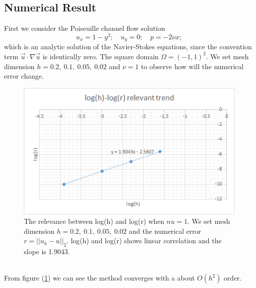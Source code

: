 \documentclass[a4paper]{article}
\begin{document}
\subsection{Numerical Result}
First we consider the Poiseuille channel flow solution
\begin{equation}
u_x = 1-y^2;\quad u_y = 0;\quad p=-2\nu x;
\label{pr::accurate}
\end{equation}
which is an analytic solution of the Navier-Stokes equations, since the convention term $\vec{u}\cdot \nabla \vec{u}$ is identically zero. The square domain $\Omega = (-1,1)^2$. We set mesh dimension $h=0.2,\ 0.1,\ 0.05,\ 0.02$ and $\nu=1$ to observe how will the numerical error change.
\begin{figure}[h]
\centering
\includegraphics[scale = 0.8]{images/convergence.png}
\caption{The relevance between log(h) and log(r) when $nu=1$. We set mesh dimension $h=0.2,\ 0.1, \ 0.05, \ 0.02$ and the numerical error $r=||u_h-u||_2$. log(h) and log(r) shows linear correlation and the slope is 1.9043.}
\label{im::log(h)-res}
\end{figure}
\\
From figure (\ref{im::log(h)-res}) we can see the method converges with a about $O(h^2)$ order. \\
\end{document}

